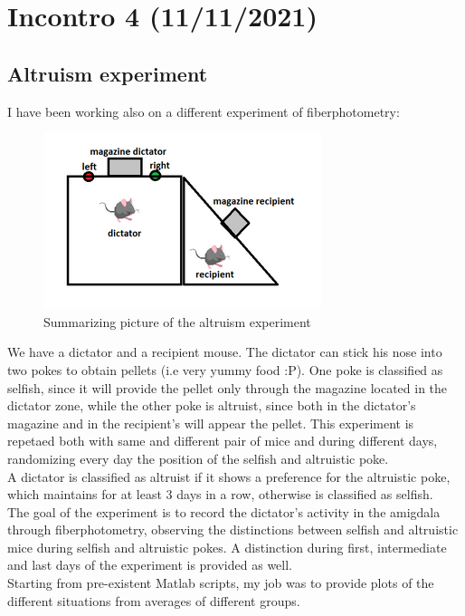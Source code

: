 \documentclass[a4paper]{article}
\begin{document}
		\newpage
		
		\section{Incontro 4 (11/11/2021)}
		
		
		\subsection{Altruism experiment}
		
		I have been working also on a different experiment of fiberphotometry: \\
		
		\begin{figure}[H]
			\begin{center}
				\includegraphics[scale=.90]{altruism.png} 
			\end{center} 
			\caption{Summarizing picture of the altruism experiment}
		\end{figure}
		
		We have a dictator and a recipient mouse. The dictator can stick his nose into two pokes to obtain pellets (i.e very yummy food :P). One poke is classified as selfish, since it will provide the pellet only through the magazine located in the dictator zone, while the other poke is altruist, since both in the dictator's magazine and in the recipient's will appear the pellet. This experiment is repetaed both with same and different pair of mice and during different days, randomizing every day the position of the selfish and altruistic poke. \\
		A dictator is classified as altruist if it shows a preference for the altruistic poke, which maintains for at least 3 days in a row, otherwise is classified as selfish.\\
		The goal of the experiment is to record the dictator's activity in the amigdala through fiberphotometry, observing the distinctions between selfish and altruistic mice during selfish and altruistic pokes. A distinction during first, intermediate and last days of the experiment is provided as well.
		\\
		Starting from pre-existent Matlab scripts, my job was to provide plots of the different situations from averages of different groups.
		
\end{document}
